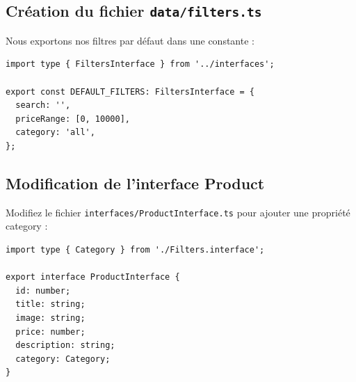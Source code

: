\subsection{Création du fichier {\tt data/filters.ts}}
Nous exportons nos filtres par défaut dans une constante :
\begin{verbatim}
import type { FiltersInterface } from '../interfaces';

export const DEFAULT_FILTERS: FiltersInterface = {
  search: '',
  priceRange: [0, 10000],
  category: 'all',
};
\end{verbatim}
\subsection{Modification de l'interface Product}
Modifiez le fichier {\tt interfaces/ProductInterface.ts} pour ajouter une propriété {\color{monOrange}category} :
\begin{verbatim}
import type { Category } from './Filters.interface';

export interface ProductInterface {
  id: number;
  title: string;
  image: string;
  price: number;
  description: string;
  category: Category;
}
\end{verbatim}
